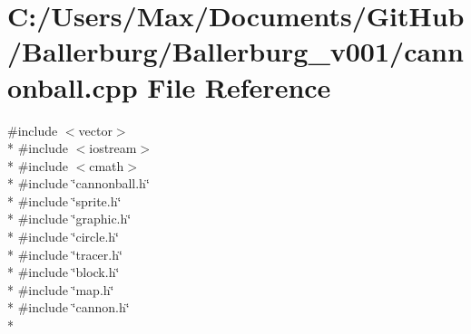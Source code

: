 \section{C\+:/\+Users/\+Max/\+Documents/\+Git\+Hub/\+Ballerburg/\+Ballerburg\+\_\+v001/cannonball.cpp File Reference}
\label{cannonball_8cpp}
{\ttfamily \#include $<$vector$>$}\\*
{\ttfamily \#include $<$iostream$>$}\\*
{\ttfamily \#include $<$cmath$>$}\\*
{\ttfamily \#include \char`\"{}cannonball.\+h\char`\"{}}\\*
{\ttfamily \#include \char`\"{}sprite.\+h\char`\"{}}\\*
{\ttfamily \#include \char`\"{}graphic.\+h\char`\"{}}\\*
{\ttfamily \#include \char`\"{}circle.\+h\char`\"{}}\\*
{\ttfamily \#include \char`\"{}tracer.\+h\char`\"{}}\\*
{\ttfamily \#include \char`\"{}block.\+h\char`\"{}}\\*
{\ttfamily \#include \char`\"{}map.\+h\char`\"{}}\\*
{\ttfamily \#include \char`\"{}cannon.\+h\char`\"{}}\\*
